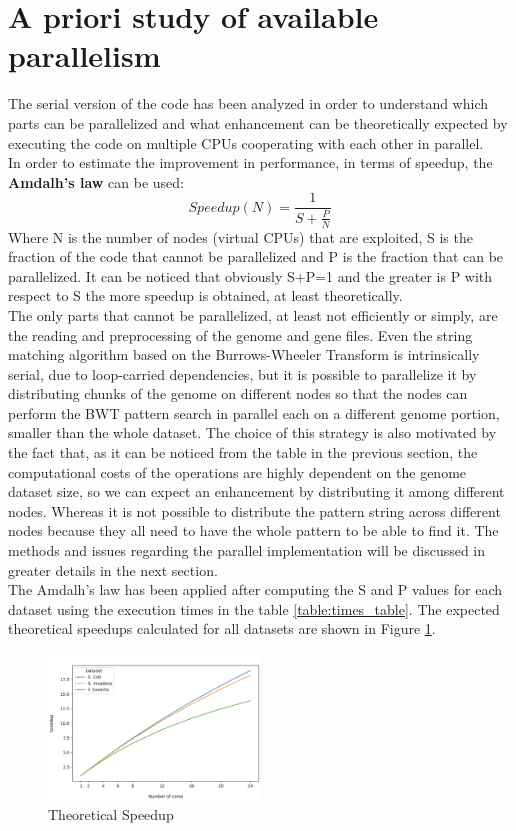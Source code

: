 \documentclass[final,5p,times,twocolumn,authoryear]{elsarticle}
\begin{document}
\section{A priori study of available parallelism}
The serial version of the code has been analyzed in order to understand which parts can be parallelized and what enhancement can be theoretically expected by executing the code on multiple CPUs cooperating with each other in parallel.\\
In order to estimate the improvement in performance, in terms of speedup, the \textbf{Amdalh's law} can be used:
$$ Speedup(N) = \frac{1}{S + \frac{P}{N}} $$
Where N is the number of nodes (virtual CPUs) that are exploited, S is the fraction of the code that cannot be parallelized and P is the fraction that can be parallelized. It can be noticed that obviously S+P=1 and the greater is P with respect to S the more speedup is obtained, at least theoretically.\\
The only parts that cannot be parallelized, at least not efficiently or simply, are the reading and preprocessing of the genome and gene files. Even the string matching algorithm based on the Burrows-Wheeler Transform is intrinsically serial, due to loop-carried dependencies, but it is possible to parallelize it by distributing chunks of the genome on different nodes so that the nodes can perform the BWT pattern search in parallel each on a different genome portion, smaller than the whole dataset. The choice of this strategy is also motivated by the fact that, as it can be noticed from the table in the previous section, the computational costs of the operations are highly dependent on the genome dataset size, so we can expect an enhancement by distributing it among different nodes. Whereas it is not possible to distribute the pattern string across different nodes because they all need to have the whole pattern to be able to find it. The methods and issues regarding the parallel implementation will be discussed in greater details in the next section. \\
The Amdalh's law has been applied after computing the S and P values for each dataset using the execution times in the table \ref{table:times_table}. The expected theoretical speedups calculated for all datasets are shown in Figure \ref{fig:theoretical-speedup-label}.
\begin{figure}[H]
   \centering
   \includegraphics[width=0.5\textwidth]{images/theoretical_speedup.png}
   \caption{Theoretical Speedup}
   \label{fig:theoretical-speedup-label}
\end{figure}
\end{document}
